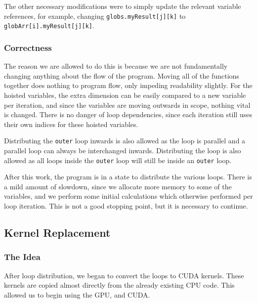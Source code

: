 \documentclass[12pt, oneside]{article}
\begin{document}
The other necessary modifications were to simply update the relevant variable references, for example, changing \texttt{globs.myResult[j][k]} to\\ \texttt{globArr[i].myResult[j][k]}.
\subsubsection{Correctness}
The reason we are allowed to do this is because we are not fundamentally changing anything about the flow of the program. Moving all of the functions together does nothing to program flow, only impeding readability slightly. For the hoisted variables, the extra dimension can be easily compared to a new variable per iteration, and since the variables are moving outwards in scope, nothing vital is changed. There is no danger of loop dependencies, since each iteration still uses their own indices for these hoisted variables.

Distributing the \texttt{outer} loop inwards is also allowed as the loop is
parallel and a parallel loop can always be interchanged inwards. Distributing
the loop is also allowed as all loops inside the \texttt{outer} loop will still
be inside an \texttt{outer} loop.
			
After this work, the program is in a state to distribute the various loops. There is a mild amount of slowdown, since we allocate more memory to some of the variables, and we perform some initial calculations which otherwise performed per loop iteration. This is not a good stopping point, but it is necessary to continue.
\subsection{Kernel Replacement}
\subsubsection{The Idea}
After loop distribution, we began to convert the loops to CUDA kernels. These kernels are copied almost directly from the already existing CPU code. This allowed us to begin using the GPU, and CUDA.
\end{document}
